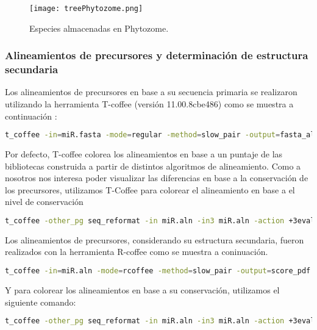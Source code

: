 \begin{figure}[htbp!] 
    \centering    
    \texttt{[image: treePhytozome.png]}
    \caption[Especies almacenadas en Phytozome]{Especies almacenadas en Phytozome.}
    \label{fig:treePhytozome}
\end{figure}

\subsubsection{Alineamientos de precursores y determinación de estructura secundaria}

Los alineamientos de precursores en base a su secuencia primaria se realizaron utilizando la herramienta T-coffee (versión 11.00.8cbe486) \citep{pmid10964570} como se muestra a continuación :

\begin{lstlisting}[language=bash]
t_coffee -in=miR.fasta -mode=regular -method=slow_pair -output=fasta_aln -quiet=stdout -out=miR.aln
\end{lstlisting}

Por defecto, T-coffee colorea los alineamientos en base a un puntaje de las bibliotecas construida a partir de distintos algoritmos de alineamiento.
Como a nosotros nos interesa poder visualizar las diferencias en base a la conservación de los precursores, utilizamos T-Coffee para colorear el alineamiento en base a el nivel de conservación

\begin{lstlisting}[language=bash]
t_coffee -other_pg seq_reformat -in miR.aln -in3 miR.aln -action +3evaluate idmat -out=miR_T_Coffee.pdf
\end{lstlisting}

Los alineamientos de precursores, considerando su estructura secundaria, fueron realizados con la herramienta R-coffee \citep{pmid18292307} como se muestra a coninuación.

\begin{lstlisting}[language=bash]
t_coffee -in=miR.aln -mode=rcoffee -method=slow_pair -output=score_pdf score_ascii -run_name=miR_R_Coffee
\end{lstlisting}

Y para colorear los alineamientos en base a su conservación, utilizamos el siguiente comando:

\begin{lstlisting}[language=bash]
t_coffee -other_pg seq_reformat -in miR.aln -in3 miR.aln -action +3evaluate idmat -out= miR.aln_R_Coffee.pdf
\end{lstlisting}

